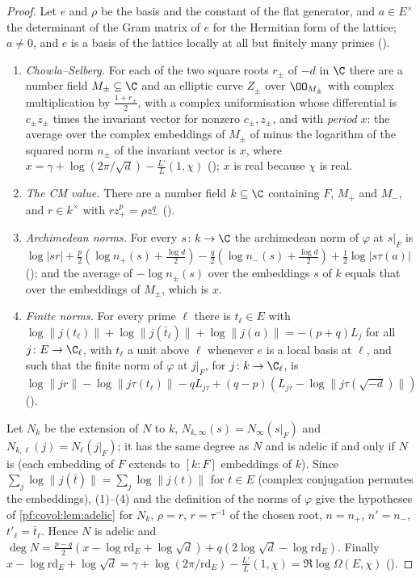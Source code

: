 \begin{proof}
Let $e$ and $\rho$ be the basis and the constant of the flat generator, and $a\in E^\times$ the determinant of
the Gram matrix of $e$ for the Hermitian form of the lattice; $a\ne0$, and $e$ is a basis of the lattice
locally at all but finitely many primes ().
\begin{enumerate}[label=(\arabic*)]
\item \emph{Chowla--Selberg.} For each of the two square roots $r_\pm$ of $-d$ in $\C$ there are a number
  field $M_\pm\subseteq\C$ and an elliptic curve $Z_\pm$ over $\OO_{M_\pm}$ with complex multiplication by
  $\frac{1+r_\pm}2$, with a complex uniformisation whose differential is $c_\pm z_\pm$ times the invariant
  vector for nonzero $c_\pm,z_\pm$, and with \emph{period} $x$: the average over the complex embeddings of
  $M_\pm$ of minus the logarithm of the squared norm $n_\pm$ of the invariant vector is $x$, where
  $x=\gamma+\log(2\pi/\sqrt d)-\frac{L'}{L}(1,\chi)$ (); $x$ is
  real because $\chi$ is real.
\item \emph{The CM value.} There are a number field $k\subseteq\C$ containing $F$, $M_+$ and $M_-$, and
  $r\in k^\times$ with $r z_+^p=\rho z_-^q$ ().
\item \emph{Archimedean norms.} For every $s\colon k\to\C$ the archimedean norm of $\varphi$ at $s|_F$ is
  $\log|s r|+\frac p2(\log n_+(s)+\frac{\log d}2)-\frac q2(\log n_-(s)+\frac{\log d}2)+\frac12\log|s\tau(a)|$
  (); and the average of $-\log n_\pm(s)$ over the
  embeddings $s$ of $k$ equals that over the embeddings of $M_\pm$, which is $x$.
\item \emph{Finite norms.} For every prime $\ell$ there is $t_\ell\in E$ with
  $\log\|j(t_\ell)\|+\log\|j(\bar t_\ell)\|+\log\|j(a)\|=-(p+q)L_j$ for all $j\colon E\to\C_\ell$, with $t_\ell$
  a unit above $\ell$ whenever $e$ is a local basis at $\ell$, and such that the finite norm of $\varphi$ at
  $j|_F$, for $j\colon k\to\C_\ell$, is
  $\log\|jr\|-\log\|j\tau(t_\ell)\|-qL_{j\tau}+(q-p)(L_{j\tau}-\log\|j\tau(\sqrt{-d})\|)$
  ().
\end{enumerate}
Let $N_k$ be the extension of $N$ to $k$, $N_{k,\infty}(s)=N_\infty(s|_F)$ and $N_{k,\ell}(j)=N_\ell(j|_F)$; it has
the same degree as $N$ and is adelic if and only if $N$ is
(each embedding of $F$ extends to $[k:F]$ embeddings of $k$). Since $\sum_j\log\|j(\bar t)\|=\sum_j\log\|j(t)\|$ for $t\in E$ (complex
conjugation permutes the embeddings), (1)--(4) and the definition of the norms of $\varphi$ give the
hypotheses of \cref{pf:covol:lem:adelic} for $N_k$, $\rho=r$, $r=\tau^{-1}$ of the chosen root,
$n=n_+$, $n'=n_-$, $t'_\ell=\bar t_\ell$. Hence $N$ is adelic and $\deg N=\frac{p-q}2(x-\log\mathrm{rd}_E+
\log\sqrt d)+q(2\log\sqrt d-\log\mathrm{rd}_E)$. Finally $x-\log\mathrm{rd}_E+\log\sqrt d=\gamma+
\log(2\pi/\mathrm{rd}_E)-\frac{L'}{L}(1,\chi)=\Re\log\Omega(E,\chi)$
().
\end{proof}
